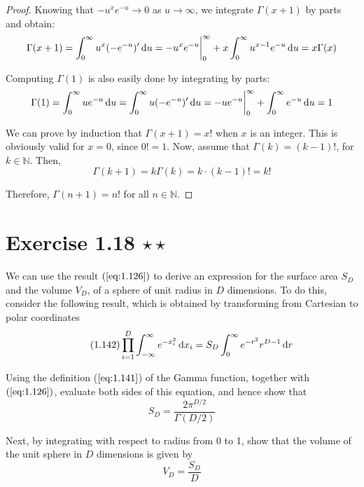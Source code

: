 \vspace{1em}

\begin{proof}
    Knowing that $-u^xe^{-u} \to 0$ as $u \to \infty$, 
    we integrate $\Gamma(x + 1)$ by parts and obtain:
     \[
         \Gamma(x+1) = \int_{0}^{\infty} u^x (-e^{-u})' \mathop{}\!\mathrm{d} u
         = -u^x e^{-u} \bigg|_0^\infty + x \int_{0}^\infty u^{x - 1} e^{-u} \mathop{}\!\mathrm{d} u
         = x\Gamma(x)
    \] 

    Computing $\Gamma(1)$ is also easily done by integrating by parts:
    \[
        \Gamma(1) = \int_{0}^{\infty} ue^{-u} \mathop{}\!\mathrm{d} u
        = \int_{0}^{\infty} u(-e^{-u})' \mathop{}\!\mathrm{d} u
        = -ue^{-u}\bigg|_0^\infty + \int_{0}^{\infty} e^{-u} \mathop{}\!\mathrm{d} u 
        = 1
    \] 

    We can prove by induction that $\Gamma(x + 1) = x!$ when $x$ 
    is an integer. This is obviously valid for $x = 0$, since $0! = 1$.
    Now, assume that $\Gamma(k) = (k - 1)!$, for $k \in \mathbb{N}$. Then,
     \[
         \Gamma(k + 1) = k\Gamma(k) = k \cdot (k - 1)! = k!
    \] 

    Therefore, $\Gamma(n + 1) = n!$ for all $n \in \mathbb{N}$.
\end{proof}

\section*{Exercise 1.18 $\star \star$}
We can use the result $(\ref{eq:1.126})$ to derive an expression for the
surface area $S_D$ and the volume $V_D$, of a sphere of unit radius in  
$D$ dimensions. To do this, consider the following result, which is obtained
by transforming from Cartesian to polar coordinates
\begin{equation}\label{eq:1.142}\tag{1.142}
    \prod_{i = 1}^D \int_{-\infty}^{\infty} e^{-x_i^2} \mathop{}\!\mathrm{d} x_i 
    = S_D \int_{0}^{\infty} e^{-r^2} r^{D - 1} \mathop{}\!\mathrm{d} r 
\end{equation}

Using the definition ($\ref{eq:1.141}$) of the Gamma function, together with
$(\ref{eq:1.126})$, evaluate both sides of this equation, and hence show that
\begin{equation}\label{eq:1.143}\tag{1.143}
    S_D =\frac{2\pi^{D/2}}{\Gamma(D/2)}
\end{equation}

Next, by integrating with respect to radius from 0 to 1, show that the volume
of the unit sphere in $D$ dimensions is given by
\begin{equation}\label{eq:1.144}\tag{1.144}
    V_D = \frac{S_D}{D}
\end{equation}

